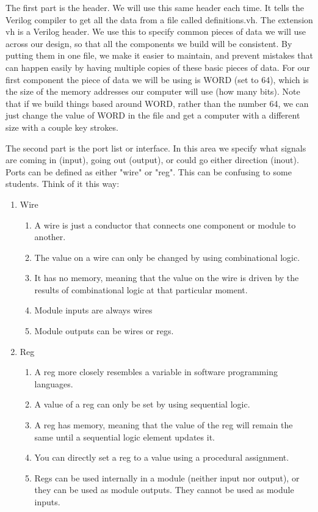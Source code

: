The first part is the header.  We will use this same header each time.  It tells the Verilog compiler to get all the data from a file called definitions.vh.  The extension vh is a Verilog header.  We use this to specify common pieces of data we will use across our design, so that all the components we build will be consistent.  By putting them in one file, we make it easier to maintain, and prevent mistakes that can happen easily by having multiple copies of these basic pieces of data.  For our first component the piece of data we will be using is WORD (set to 64), which is the size of the memory addresses our computer will use (how many bits).  Note that if we build things based around WORD, rather than the number 64, we can just change the value of WORD in the file and get a computer with a different size with a couple key strokes.

The second part is the port list or interface.  In this area we specify what signals are coming in (input), going out (output), or could go either direction (inout).  Ports can be defined as either "wire" or "reg".  This can be confusing to some students.  Think of it this way: 
\begin{enumerate}
	\item Wire
	\begin{enumerate}
		\item A wire is just a conductor that connects one component or module to another.
		\item The value on a wire can only be changed by using combinational logic.
		\item It has no memory, meaning that the value on the wire is driven by the results of combinational logic at that particular moment.
		\item Module inputs are always wires
		\item Module outputs can be wires or regs.
	\end{enumerate}
	\item Reg
	\begin{enumerate}
		\item A reg more closely resembles a variable in software programming languages.
		\item A value of a reg can only be set by using sequential logic.
		\item A reg has memory, meaning that the value of the reg will remain the same until a sequential logic element updates it.
		\item You can directly set a reg to a value using a procedural assignment.
		\item Regs can be used internally in a module (neither input nor output), or they can be used as module outputs.  They cannot be used as module inputs. 
	\end{enumerate}
\end{enumerate}

